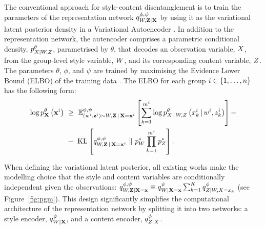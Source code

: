 \documentclass[../thesis.tex]{subfiles}
\begin{document}
The conventional approach for style-content disentanglement is to train the parameters of the representation network $\myfunc{q}^{\phi, \psi}_{\myrv{w}, \mygroup{\myrv{z}} | \mygroup{\myrv{x}}}$ by using it as the variational latent posterior density in a Variational Autoencoder \citep{bouchacourt2017multi,hosoyaGroupbasedLearningDisentangled2019,nemethAdversarialDisentanglementGrouped2020}. In addition to the representation network, the autencoder comprises a parametric conditional density, $\myfunc{p}^{\theta}_{\myrv{x} | \myrv{w}, \myrv{z}}$, parametrised by $\theta$, that decodes an observation variable, $\myrv{x}$, from the group-level style variable, $\myrv{w}$, and its corresponding content variable, $\myrv{z}$. The parameters $\theta$, $\phi$, and $\psi$ are trained by maximising the Evidence Lower Bound (ELBO) of the training data \citep{kingma2013auto,rezende2014stochastic}. The ELBO for each group $i \in \{1,\dots,n\}$ has the following form:
\begin{align}
\begin{split}
      \log \myfunc{p}^{\theta}_{\mygroup{\myrv{x}}} \left( \mygroup{\myvect{x}}^i \right) ~&\geq~ \mathbb{E}^{\phi, \psi}_{(\myvect{w}^i, \mygroup{\myvect{z}}^i) \sim \myrv{w}, \mygroup{\myrv{z}} \,|\, \mygroup{\myrv{x}} = \mygroup{\myvect{x}}^i} \left[\sum_{k=1}^{\mycnt{m}^i} \log \myfunc{p}^{\theta}_{\myrv{x} \,|\, \myrv{w}, \myrv{z}} \left( \myvect{x}^i_k \,|\, \myvect{w}^i, \myvect{z}^i_k \right) \right] - \\ 
      &-~ \mathrm{KL} \left[ \myfunc{q}^{\phi, \psi}_{\myrv{w}, \mygroup{\myrv{z}} \,|\, \mygroup{\myrv{x}} = \mygroup{\myvect{x}}^i} ~\|~ \myfunc{p}^{*}_{\myrv{w}} \prod_{k=1}^{\mycnt{m}^i} \myfunc{p}^{*}_{\myrv{z}} \right].
\label{eq:gvae_elbo}
\end{split}
\end{align}


When defining the variational latent posterior, all existing works make the modelling choice that the style and content variables are conditionally independent given the observations: $\myfunc{q}^{\phi, \psi}_{\myrv{w}, \mygroup{\myrv{z}} | \mygroup{\myrv{x}} = \mygroup{\myvect{x}}} \equiv \myfunc{q}^{\psi}_{\myrv{w} | \mygroup{\myrv{x}} = \mygroup{\myvect{x}}} \sum_{k=1}^{\myrv{k}} \myfunc{q}^{\phi}_{\myrv{z} | \myrv{w}, \myrv{x} = \myvect{x}_k}$ (see Figure~\ref{fig:pgm}). This design significantly simplifies the computational architecture of the representation network by splitting it into two networks: a style encoder, $\myfunc{q}^{\psi}_{\myrv{w} | \mygroup{\myrv{x}}}$, and a content encoder, $\myfunc{q}^{\phi}_{\myrv{z} | \myrv{x}}$.
\end{document}
